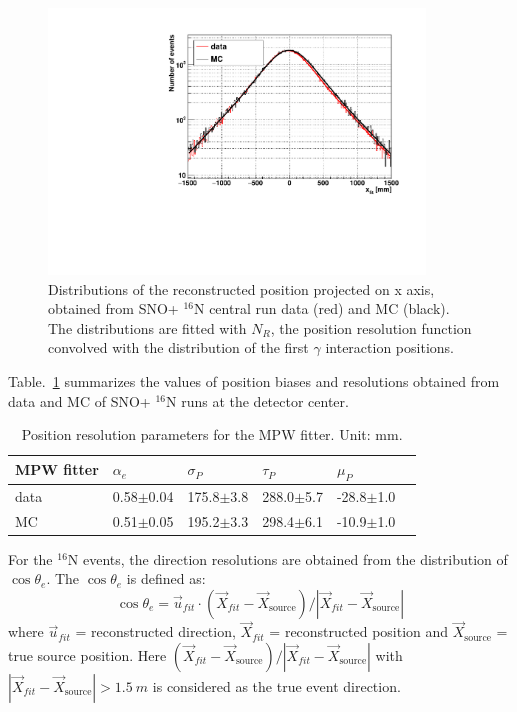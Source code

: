 \documentclass[preprint,12pt]{elsarticle}
\numberwithin{equation}{section}
\begin{document}
\begin{figure}[!htb]
	\centering
	\includegraphics[width=10cm]{posResol.pdf}
	\caption{Distributions of the reconstructed position projected on x axis, obtained from SNO+ {$^{16}$}N central run data (red) and MC (black). The distributions are fitted with $N_R$, the position resolution function convolved with the distribution of the first $\gamma$ interaction positions.}
	\label{posresol}
\end{figure}

Table.~\ref{table_posresol} summarizes the values of position biases and resolutions obtained from data and MC of SNO+ {$^{16}$}N runs at the detector center.
\vspace{2mm}
\begin{table}[ht]
\centering
\caption{Position resolution parameters for the MPW fitter. Unit: mm.}
\label{table_posresol}
\begin{tabular}{|p{2.5cm}|p{2.2cm}|p{2.1cm}|p{2.1cm}|p{2.1cm}| p{2.1cm}|}
\hline
MPW fitter & $\alpha_e$ & $\sigma_P$ &  $\tau_P$ &  $\mu_P$\\
\hline 
data& 0.58$\pm$0.04 & 175.8$\pm$3.8 & 288.0$\pm$5.7 & -28.8$\pm$1.0\\	
\hline 
MC & 0.51$\pm$0.05 & 195.2$\pm$3.3 & 298.4$\pm$6.1 & -10.9$\pm$1.0\\
\hline
\end{tabular}
\end{table}

\vspace{5mm}

For the $^{16}$N events, the direction resolutions are obtained from the distribution of $\cos\theta_e$. The $\cos\theta_e$ is defined as:
\[
\cos\theta_e = \vec{u}_{fit}\cdot (\vec{X}_{fit}-\vec{X}_\mathrm{source})/|\vec{X}_{fit}-\vec{X}_\mathrm{source}|
\]
where $\vec{u}_{fit}$ = reconstructed direction, $\vec{X}_{fit}$ = reconstructed position and $\vec{X}_\mathrm{source}$ = true source position. Here $(\vec{X}_{fit}-\vec{X}_\mathrm{source})/|\vec{X}_{fit}-\vec{X}_\mathrm{source}|$ with $|\vec{X}_{fit}-\vec{X}_\mathrm{source}|>1.5~m$ is considered as the true event direction.
\end{document}

